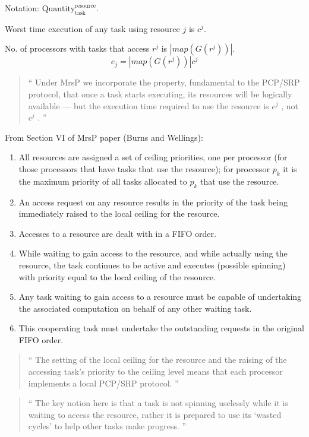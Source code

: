 Notation: $\textrm{Quantity}_{\textrm{task}}^{\textrm{resource}}$.

Worst time execution of any task using resource $j$ is $c^j$.

No. of processors with tasks that access $r^j$ is $|map(G(r^j))|$.
$$
e_j = |map(G(r^j))|c^j
$$

\begin{quote}
``
Under MrsP we incorporate the property,
fundamental to the PCP/SRP protocol,
that once a task starts executing,
its resources will be logically available
–--
but the execution time required to use the resource is $e^j$ , not $c^j$ .
''
\end{quote}

From Section VI of MrsP paper (Burns and Wellings):


\begin{enumerate}
  \item
    All resources are assigned a set of ceiling priorities,
    one per processor
    (for those processors that have tasks that use the resource);
    for processor $p_k$ it is the maximum priority
    of all tasks allocated to $p_k$ that use the resource.
  \item
    An access request on any resource results
    in the priority of the task
    being immediately raised to the local ceiling for the resource.
  \item
    Accesses to a resource are dealt with in a FIFO order.
  \item
    While waiting to gain access to the resource,
    and while actually using the resource,
    the task continues to be active and executes
    (possible spinning)
    with priority equal to the local ceiling of the resource.
  \item
    Any task waiting to gain access to a resource
    must be capable of undertaking the associated computation
    on behalf of any other waiting task.
  \item
    This cooperating task must undertake
    the outstanding requests in the original FIFO order.
\end{enumerate}

\begin{quote}
``
The setting of the local ceiling for the resource
and the raising of the accessing task’s priority to the ceiling level
means that each processor implements a local PCP/SRP protocol.
''
\end{quote}

\begin{quote}
``
The key notion here is that a task is not spinning uselessly
while it is waiting to access the resource,
rather it is prepared to use its ‘wasted cycles’
to help other tasks make progress.
''
\end{quote}

